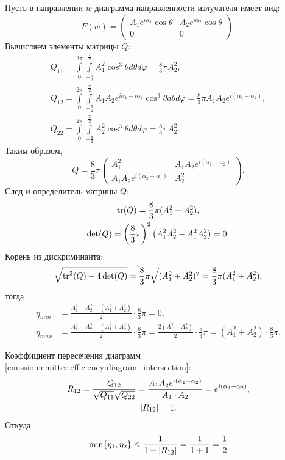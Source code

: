 Пусть в направлении $w$ диаграмма направленности излучателя имеет вид:
\[
    F(w)
    = \begin{pmatrix}
          A_1 e^{i \alpha_1} \cos \theta & A_2 e^{i \alpha_2} \cos \theta \\
          0                              & 0
    \end{pmatrix} .
\]
Вычисляем элементы матрицы $Q$:
\begin{gather*}
    Q_{11}
    = \int \limits_0^{2 \pi} \int \limits_{-\frac{\pi}{2}}^\frac{\pi}{2} A_1^2 \cos^3 \theta d\theta d\varphi
    = \frac{8}{3} \pi A_2^2 , \\
    Q_{12}
    = \int \limits_0^{2 \pi} \int \limits_{-\frac{\pi}{2}}^\frac{\pi}{2} A_1 A_2 e^{i \alpha_1 - i \alpha_2} \cos^3 \theta d\theta d\varphi
    = \frac{8}{3} \pi A_1 A_2 e^{i(\alpha_1 - \alpha_2)} , \\
    Q_{22}
    = \int \limits_0^{2 \pi} \int \limits_{-\frac{\pi}{2}}^\frac{\pi}{2} A_2^2 \cos^3 \theta d\theta d\varphi
    = \frac{8}{3} \pi A_2^2 .
\end{gather*}
Таким образом,
\[
    Q
    = \frac{8}{3} \pi
    \begin{pmatrix}
        A_1^2                              & A_1 A_2 e^{i(\alpha_1 - \alpha_2)} \\
        A_1 A_2 e^{i(\alpha_2 - \alpha_1)} & A_2^2
    \end{pmatrix} .
\]
След и определитель матрицы $Q$:
\begin{gather*}
    \operatorname{tr}(Q) = \frac{8}{3} \pi ( A_1^2 + A_2^2 ) , \\
    \det(Q)
    = \left( \frac{8}{3} \pi \right)^2 \left( A_1^2 A_2^2 - A_1^2 A_2^2 \right)
    = 0 .
\end{gather*}
Корень из дискриминанта:
\[
    \sqrt{\operatorname{tr}^2(Q) - 4 \det(Q)}
    = \frac{8}{3} \pi \sqrt{( A_1^2 + A_2^2 )^2}
    = \frac{8}{3} \pi ( A_1^2 + A_2^2 ),
\]
тогда
\begin{align*}
    \eta_{min} &
    = \frac{A_1^2 + A_2^2 - ( A_1^2 + A_2^2 )}{2} \cdot \frac{8}{3} \pi
    = 0 , \\
    \eta_{max} &
    = \frac{A_1^2 + A_2^2 + ( A_1^2 + A_2^2 )}{2} \cdot \frac{8}{3} \pi
    = \frac{2 (A_1^2 + A_2^2)}{2} \cdot \frac{8}{3} \pi
    = (A_1^2 + A_2^2) \cdot \frac{8}{3} \pi .
\end{align*}

Коэффициент пересечения диаграмм \eqref{emission:emitter:efficiency:diagram_intersection}:
\begin{gather*}
    R_{12}
    = \frac{Q_{12}}{\sqrt{Q_{11}} \sqrt{Q_{22}}}
    = \frac{A_1 A_2 e^{i(\alpha_1 - \alpha_2)}}{A_1 \cdot A_2}
    = e^{i(\alpha_1 - \alpha_2)}, \\
    \left | R_{12} \right | = 1 .
\end{gather*}
Откуда
\[
    \min \{ \eta_1, \eta_2 \} \le \frac{1}{1 + \left | R_{12} \right |} = \frac{1}{1+1} = \frac{1}{2}
\]

